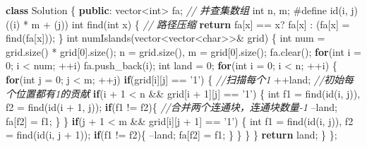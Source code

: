 \documentclass[]{article}
\newenvironment{Shaded}{}{}
\newcommand{\CharTok}[1]{\textcolor[rgb]{0.25,0.44,0.63}{#1}}
\newcommand{\CommentTok}[1]{\textcolor[rgb]{0.38,0.63,0.69}{\textit{#1}}}
\newcommand{\ControlFlowTok}[1]{\textcolor[rgb]{0.00,0.44,0.13}{\textbf{#1}}}
\newcommand{\DataTypeTok}[1]{\textcolor[rgb]{0.56,0.13,0.00}{#1}}
\newcommand{\DecValTok}[1]{\textcolor[rgb]{0.25,0.63,0.44}{#1}}
\newcommand{\KeywordTok}[1]{\textcolor[rgb]{0.00,0.44,0.13}{\textbf{#1}}}
\newcommand{\NormalTok}[1]{#1}
\newcommand{\PreprocessorTok}[1]{\textcolor[rgb]{0.74,0.48,0.00}{#1}}
\begin{document}
\begin{Shaded}
\begin{Highlighting}[]
\KeywordTok{class}\NormalTok{ Solution \{}
\KeywordTok{public}\NormalTok{:}
\NormalTok{    vector<}\DataTypeTok{int}\NormalTok{> fa; }\CommentTok{// 并查集数组}
    \DataTypeTok{int}\NormalTok{ n, m;}
    \PreprocessorTok{#define id(i, j) ((i) * m + (j))}
    \DataTypeTok{int}\NormalTok{ find(}\DataTypeTok{int}\NormalTok{ x) \{ }\CommentTok{// 路径压缩}
        \ControlFlowTok{return}\NormalTok{ fa[x] == x? fa[x] : (fa[x] = find(fa[x]));}
\NormalTok{    \}}
    \DataTypeTok{int}\NormalTok{ numIslands(vector<vector<}\DataTypeTok{char}\NormalTok{>>& grid) \{}
        \DataTypeTok{int}\NormalTok{ num = grid.size() * grid[}\DecValTok{0}\NormalTok{].size();}
\NormalTok{        n = grid.size(), m = grid[}\DecValTok{0}\NormalTok{].size();}
\NormalTok{        fa.clear();}
        \ControlFlowTok{for}\NormalTok{(}\DataTypeTok{int}\NormalTok{ i = }\DecValTok{0}\NormalTok{; i < num; ++i) fa.push_back(i);}
        \DataTypeTok{int}\NormalTok{ land = }\DecValTok{0}\NormalTok{;}
        \ControlFlowTok{for}\NormalTok{(}\DataTypeTok{int}\NormalTok{ i = }\DecValTok{0}\NormalTok{; i < n; ++i) \{}
            \ControlFlowTok{for}\NormalTok{(}\DataTypeTok{int}\NormalTok{ j = }\DecValTok{0}\NormalTok{; j < m; ++j) }\ControlFlowTok{if}\NormalTok{(grid[i][j] == }\CharTok{'1'}\NormalTok{) \{ }\CommentTok{//扫描每个1}
\NormalTok{                ++land; }\CommentTok{//初始每个位置都有1的贡献}
                \ControlFlowTok{if}\NormalTok{(i + }\DecValTok{1}\NormalTok{ < n && grid[i + }\DecValTok{1}\NormalTok{][j] == }\CharTok{'1'}\NormalTok{) \{}
                    \DataTypeTok{int}\NormalTok{ f1 = find(id(i, j)), f2 = find(id(i + }\DecValTok{1}\NormalTok{, j));}
                    \ControlFlowTok{if}\NormalTok{(f1 != f2)\{ }\CommentTok{//合并两个连通块，连通块数量-1}
\NormalTok{                        --land;}
\NormalTok{                        fa[f2] = f1;}
\NormalTok{                    \}}
\NormalTok{                \}}
                \ControlFlowTok{if}\NormalTok{(j + }\DecValTok{1}\NormalTok{ < m && grid[i][j + }\DecValTok{1}\NormalTok{] == }\CharTok{'1'}\NormalTok{) \{}
                    \DataTypeTok{int}\NormalTok{ f1 = find(id(i, j)), f2 = find(id(i, j + }\DecValTok{1}\NormalTok{));}
                    \ControlFlowTok{if}\NormalTok{(f1 != f2)\{}
\NormalTok{                        --land;}
\NormalTok{                        fa[f2] = f1;}
\NormalTok{                    \}}
\NormalTok{                \}}
\NormalTok{            \}}
\NormalTok{        \}}
        \ControlFlowTok{return}\NormalTok{ land;}
\NormalTok{    \}}
\NormalTok{\};}
\end{Highlighting}
\end{Shaded}
\end{document}
